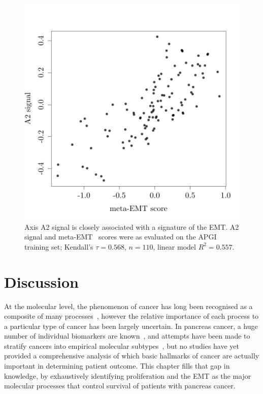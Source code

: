 \documentclass[dissertation.tex]{subfiles}
\begin{document}
\begin{figure}[!htbp]
\centering
\includegraphics[width=.7\linewidth]{analysis/biosurv/reports/18_SIS_diag_dsd_final/figure/nmf-msigdb-cor-plots-8}
\caption[A2 signal is closely associated with meta-EMT score]{Axis A2 signal is closely associated with a signature of the \gls{EMT}.  A2 signal and meta-EMT~\cite{Groger2012} scores were as evaluated on the \acrshort{APGI} training set; Kendall's $\tau = 0.568$, $n = 110$, linear model $R^2 = 0.557$.}\label{fig:sigs-axis2-emt}
\end{figure}

\section{Discussion}
At the molecular level, the phenomenon of cancer has long been recognised as a composite of many processes~\cite{Hanahan2011}, however the relative importance of each process to a particular type of cancer has been largely uncertain.  In pancreas cancer, a huge number of individual biomarkers are known~\cite{Harsha2009}, and attempts have been made to stratify cancers into empirical molecular subtypes~\cite{Collisson2011}, but no studies have yet provided a comprehensive analysis of which basic hallmarks of cancer are actually important in determining patient outcome.  This chapter fills that gap in knowledge, by exhaustively identifying proliferation and the \gls{EMT} as the major molecular processes that control survival of patients with pancreas cancer.
\end{document}
